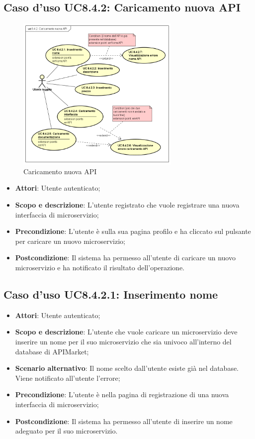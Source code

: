 \documentclass[12pt,a4paper,titlepage]{article}
\begin{document}
	\subsection{Caso d'uso UC8.4.2: Caricamento nuova API}
	\label{UC8.4.2}
	\begin{figure}[H]
		\centering
		\includegraphics[width=0.7\textwidth]{UseCase/CaricamentoNuovaAPI}
		\caption{Caricamento nuova API}
	\end{figure}
	\begin{itemize}
		\item \textbf{Attori}: Utente autenticato;
		\item \textbf{Scopo e descrizione}: L'utente registrato che vuole registrare una nuova interfaccia di microservizio;
		\item \textbf{Precondizione}: L'utente è sulla sua pagina profilo e ha cliccato sul pulsante per caricare un nuovo microservizio;
		\item \textbf{Postcondizione}: Il sistema ha permesso all'utente di caricare un nuovo microservizio e ha notificato il risultato dell'operazione.
	\end{itemize}
	\subsection{Caso d'uso UC8.4.2.1: Inserimento nome}
	\label{UC8.4.2.1}
	\begin{itemize}
		\item \textbf{Attori}: Utente autenticato;
		\item \textbf{Scopo e descrizione}: L'utente che vuole caricare un microservizio deve inserire un nome per il suo microservizio che sia univoco all'interno del database di APIMarket;
		\item \textbf{Scenario alternativo}: Il nome scelto dall'utente esiste già nel database. Viene notificato all'utente l'errore;
		\item \textbf{Precondizione}: L'utente è nella pagina di registrazione di una nuova interfaccia di microservizio;
		\item \textbf{Postcondizione}: Il sistema ha permesso all'utente di inserire un nome adeguato per il suo microservizio.
	\end{itemize}
\end{document}
